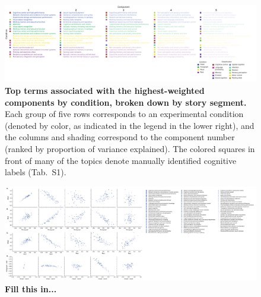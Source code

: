 \documentclass[english]{article}
\begin{document}
\begin{figure}
  \centering
  \includegraphics[width=\textwidth]{figs/top_terms_by_component}

\caption{\textbf{Top terms associated with the highest-weighted components by
condition, broken down by story segment.} Each group of five rows corresponds
to an experimental condition (denoted by color, as indicated in the legend in
the lower right), and the columns and shading correspond to the component
number (ranked by proportion of variance explained). The colored squares in
front of many of the topics denote manually identified cognitive labels
(Tab.~S1).}

\label{fig:top-terms}
\end{figure}

\begin{figure}
  \centering
  \includegraphics[width=\textwidth]{figs/topic_contrasts}

\caption{\textbf{Fill this in...}}

\label{fig:contrasts}

\end{figure}

\newpage
\renewcommand{\refname}{Supplemental references}


\end{document}
